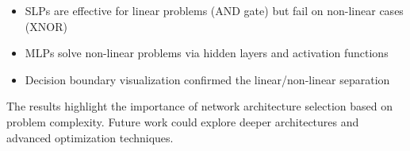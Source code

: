 \documentclass[12pt]{article}
\begin{document}
\begin{itemize}[noitemsep,topsep=0pt]
    \item SLPs are effective for linear problems (AND gate) but fail on non-linear cases (XNOR)
    \item MLPs solve non-linear problems via hidden layers and activation functions
    \item Decision boundary visualization confirmed the linear/non-linear separation
\end{itemize}

The results highlight the importance of network architecture selection based on problem complexity. Future work could explore deeper architectures and advanced optimization techniques.
\end{document}
